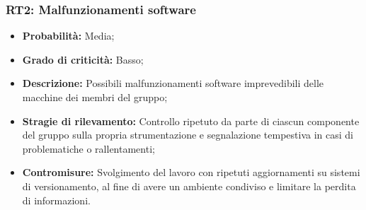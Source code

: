 \subsubsection{RT2: Malfunzionamenti software}
\begin{itemize}
    \item \textbf{Probabilità:} Media;
    \item \textbf{Grado di criticità:} Basso;
    \item \textbf{Descrizione:} Possibili malfunzionamenti software imprevedibili delle macchine dei membri del gruppo;
    \item \textbf{Stragie di rilevamento:} Controllo ripetuto da parte di ciascun componente del gruppo sulla propria strumentazione e segnalazione tempestiva in casi di problematiche o rallentamenti;
    \item \textbf{Contromisure:} Svolgimento del lavoro con ripetuti aggiornamenti su sistemi di versionamento, al fine di avere un ambiente condiviso e limitare la perdita di informazioni.  
\end{itemize}
